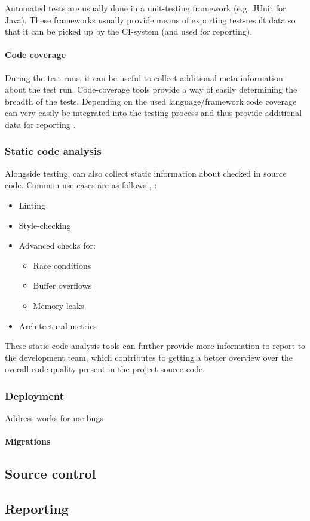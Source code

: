 Automated tests are usually done in a unit-testing framework (e.g. JUnit for
Java). These frameworks usually provide means of exporting test-result data so
that it can be picked up by the CI-system (and used for reporting).

\paragraph{Code coverage}
During the test runs, it can be useful to collect
additional meta-information about the test run. Code-coverage tools provide a
way of easily determining the breadth of the tests. Depending on the used
language/framework code coverage can very easily be integrated into the testing
process and thus provide additional data for reporting \cite{kajo-mece:2012}.

\subsubsection{Static code analysis}\label{sec:static-code-analysis}

Alongside testing, can also collect static information about checked in source
code. Common use-cases are as follows \cite{bommer:2008}, \cite{sneed:2010}:

\begin{itemize}
    \item Linting
    \item Style-checking
    \item Advanced checks for:
    \begin{itemize}
        \item Race conditions
        \item Buffer overflows
        \item Memory leaks
    \end{itemize}
    \item Architectural metrics
\end{itemize}

These static code analysis tools can further provide more information to report
to the development team, which contributes to getting a better overview over the
overall code quality present in the project source code.

\subsubsection{Deployment}\label{sec:deployment}

Address works-for-me-bugs

\paragraph{Migrations}\label{sec:migrations}

\subsection{Source control}\label{sec:source-control}

\subsection{Reporting}\label{sec:reporting}


